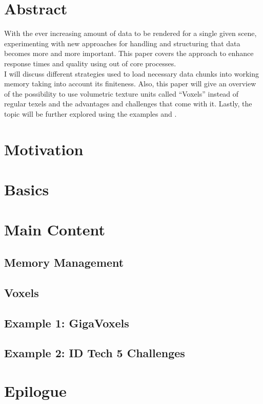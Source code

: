 
\chapter{Abstract}
\label{ch:Abstract}

With the ever increasing amount of data to be rendered for a single given scene, experimenting with new approaches for handling and structuring that data becomes more and more important. This paper covers the approach to enhance response times and quality using out of core processes. \\
I will discuss different strategies used to load necessary data chunks into working memory taking into account its finiteness. Also, this paper will give an overview of the possibility to use volumetric texture units called ``Voxels'' instead of regular texels and the advantages and challenges that come with it. Lastly, the topic will be further explored using the examples \cite{Crassin:2009:GRS:1507149.1507152} and \cite{van2009id}.
%



\chapter{Motivation}
\label{ch:Motivation}

\chapter{Basics}
\label{ch:Basics}


\chapter{Main Content}
\label{ch:MainContent}

\section{Memory Management}


\section{Voxels}

\section{Example 1: GigaVoxels}


\section{Example 2: ID Tech 5 Challenges}

\chapter{Epilogue}
\label{ch:Epilogue}